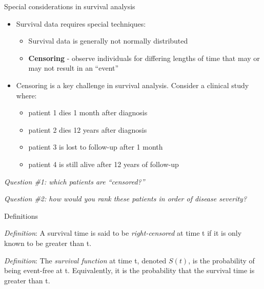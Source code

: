 \documentclass[
  ignorenonframetext,
]{beamer}
\providecommand{\tightlist}{%
  \setlength{\itemsep}{0pt}\setlength{\parskip}{0pt}}
\begin{document}
\begin{frame}{Special considerations in survival analysis}
\protect\hypertarget{special-considerations-in-survival-analysis}{}

\begin{itemize}
\tightlist
\item
  Survival data requires special techniques:

  \begin{itemize}
  \tightlist
  \item
    Survival data is generally not normally distributed
  \item
    \textbf{Censoring} - observe individuals for differing lengths of
    time that may or may not result in an ``event''
  \end{itemize}
\item
  Censoring is a key challenge in survival analysis. Consider a clinical
  study where:

  \begin{itemize}
  \tightlist
  \item
    patient 1 dies 1 month after diagnosis
  \item
    patient 2 dies 12 years after diagnosis
  \item
    patient 3 is lost to follow-up after 1 month
  \item
    patient 4 is still alive after 12 years of follow-up
  \end{itemize}
\end{itemize}

\emph{Question \#1: which patients are ``censored?''}

\emph{Question \#2: how would you rank these patients in order of
disease severity?}

\end{frame}

\begin{frame}{Definitions}
\protect\hypertarget{definitions}{}

\emph{Definition}: A survival time is said to be \emph{right-censored}
at time t if it is only known to be greater than t.

\emph{Definition}: The \emph{survival function} at time t, denoted
\(S(t)\), is the probability of being event-free at t. Equivalently, it
is the probability that the survival time is greater than t.

\end{frame}
\end{document}
